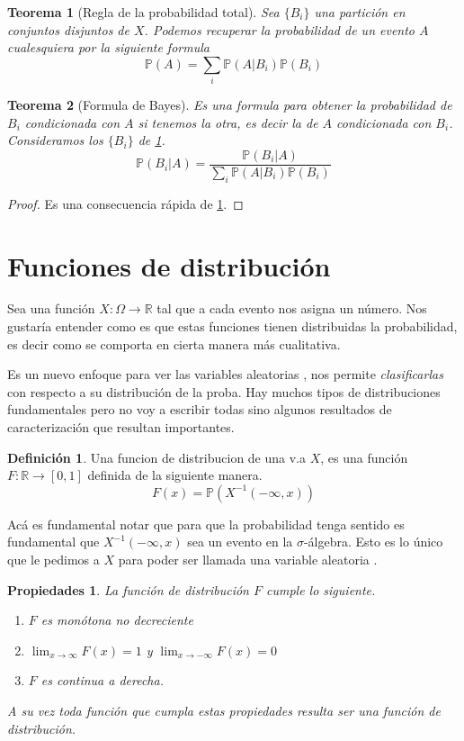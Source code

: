 \documentclass[11pt]{article}
\theoremstyle{plain} %
\newtheorem{teorema}{\color{rojo}Teorema}
\newtheorem*{props}{\color{rojo} Propiedades}
\theoremstyle{definition}
\newtheorem*{definicion}{Definici\'{o}n} %
\theoremstyle{remark}
\def\Om{\Omega}
\def\R{\mathbb{R}}
\def\P{\mathbb{P}}
\def\va{variable aleatoria }
\def\vas{variables aleatorias }
\def\blue{\textcolor{blue!60!black}}
\begin{document}
\begin{teorema}
	[Regla de la probabilidad total] \label{teo:total}
	Sea $\{B_i\}$ una partici\'on  en conjuntos disjuntos de $X$. Podemos recuperar la probabilidad de un evento $A$ cualesquiera por la siguiente formula
	\[ \P(A) = \sum_{i}\P(A|B_i)\P(B_i)\]
\end{teorema}

\begin{teorema}
	[Formula de Bayes]
	Es una formula para obtener la probabilidad de $B_i$ condicionada con $A$ si tenemos la otra, es decir la de $A$ condicionada con $B_i$. Consideramos los $\{B_i\}$ de \ref{teo:total}.
	\[\P(B_i|A) = \dfrac{\P(B_i|A)}{\sum_{i}\P(A|B_i)\P(B_i)}\]
\end{teorema}

\begin{proof}
	Es una consecuencia r\'apida de \ref{teo:total}.
\end{proof}
\bigskip

\section{Funciones de distribuci\'on}

Sea una función $X:\Om \to \R$ tal que a cada evento nos asigna un número. Nos gustaría entender como es que estas funciones tienen distribuidas la probabilidad, es decir como se comporta en cierta manera más cualitativa. 

Es un nuevo enfoque para ver las \vas, nos permite \textit{clasificarlas} con respecto a su distribución de la proba. Hay muchos tipos de distribuciones fundamentales pero no voy a escribir todas sino algunos resultados de caracterización que resultan importantes. 

\begin{definicion}
	Una \blue{funcion de distribucion} de una v.a $X$, es una funci\'on $F:\R \to [0,1]$ definida de la siguiente manera.
	\[F(x) = \P \left( X^{-1}(-\infty,x) \right)\]
\end{definicion}

Acá es fundamental notar que para que la probabilidad tenga sentido es fundamental que $X^{-1}(-\infty,x)$ sea un evento en la $\sigma$-álgebra. Esto es lo único que le pedimos a $X$ para poder ser llamada una \va.

\begin{props}
	La funci\'on de distribuci\'on $F$ cumple lo siguiente.
	\begin{enumerate}
		\item $F$ es mon\'otona no decreciente 
		\item $\lim_{x \to \infty} F(x) = 1 $ y $\lim_{x \to - \infty} F(x) = 0$
		\item $F$ es continua a derecha.
	\end{enumerate}
	A su vez toda función que cumpla estas propiedades resulta ser una función de distribución.
\end{props}
\end{document}
